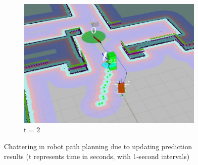 \begin{figure}[H]
  \begin{subfigure}{\linewidth}
    \centering
    \includegraphics[keepaspectratio, scale=0.28]{images/seq-21.png}
    \caption{t = 2}
    \label{Fig:seq-21}
  \end{subfigure}
  
  
  \caption{\centering Chattering in robot path planning due to updating prediction results \newline (t represents time in seconds, with 1-second intervals)}
  \label{Fig:sequences}
\end{figure}

\newpage
